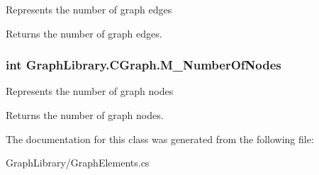 Represents the number of graph edges 

Returns the number of graph edges. \hypertarget{class_graph_library_1_1_c_graph_a77c0f98b93196dd167a2b0bfcd4ae6fb}{}
\subsubsection[{M\+\_\+\+Number\+Of\+Nodes}]{\setlength{\rightskip}{0pt plus 5cm}int Graph\+Library.\+C\+Graph.\+M\+\_\+\+Number\+Of\+Nodes\hspace{0.3cm}{\ttfamily [get]}}\label{class_graph_library_1_1_c_graph_a77c0f98b93196dd167a2b0bfcd4ae6fb}


Represents the number of graph nodes 

Returns the number of graph nodes. 

The documentation for this class was generated from the following file\+:\begin{DoxyCompactItemize}
\item 
Graph\+Library/Graph\+Elements.\+cs\end{DoxyCompactItemize}

